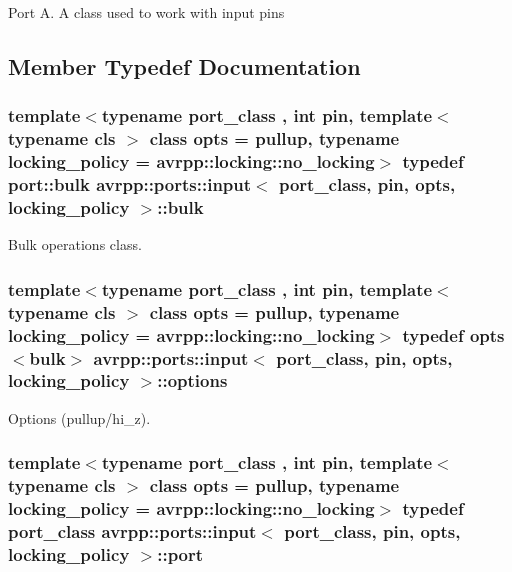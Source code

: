 Port A. A class used to work with input pins 

\subsection{Member Typedef Documentation}
\hypertarget{structavrpp_1_1ports_1_1input_adf9cfdfcdab5c36b1cfc52d1bfd98ccc}{
\subsubsection[{bulk}]{\setlength{\rightskip}{0pt plus 5cm}template$<$typename port\_\-class , int pin, template$<$ typename cls $>$ class opts = pullup, typename locking\_\-policy  = avrpp::locking::no\_\-locking$>$ typedef port::bulk {\bf avrpp::ports::input}$<$ port\_\-class, pin, opts, locking\_\-policy $>$::{\bf bulk}}}
\label{structavrpp_1_1ports_1_1input_adf9cfdfcdab5c36b1cfc52d1bfd98ccc}


Bulk operations class. 

\hypertarget{structavrpp_1_1ports_1_1input_a4c2883f843fd1029740bbe13a0165de8}{
\subsubsection[{options}]{\setlength{\rightskip}{0pt plus 5cm}template$<$typename port\_\-class , int pin, template$<$ typename cls $>$ class opts = pullup, typename locking\_\-policy  = avrpp::locking::no\_\-locking$>$ typedef opts$<${\bf bulk}$>$ {\bf avrpp::ports::input}$<$ port\_\-class, pin, opts, locking\_\-policy $>$::{\bf options}}}
\label{structavrpp_1_1ports_1_1input_a4c2883f843fd1029740bbe13a0165de8}


Options (pullup/hi\_\-z). 

\hypertarget{structavrpp_1_1ports_1_1input_a4f70c33283820b676b6cf50620a4a7bb}{
\subsubsection[{port}]{\setlength{\rightskip}{0pt plus 5cm}template$<$typename port\_\-class , int pin, template$<$ typename cls $>$ class opts = pullup, typename locking\_\-policy  = avrpp::locking::no\_\-locking$>$ typedef port\_\-class {\bf avrpp::ports::input}$<$ port\_\-class, pin, opts, locking\_\-policy $>$::{\bf port}}}
\label{structavrpp_1_1ports_1_1input_a4f70c33283820b676b6cf50620a4a7bb}


